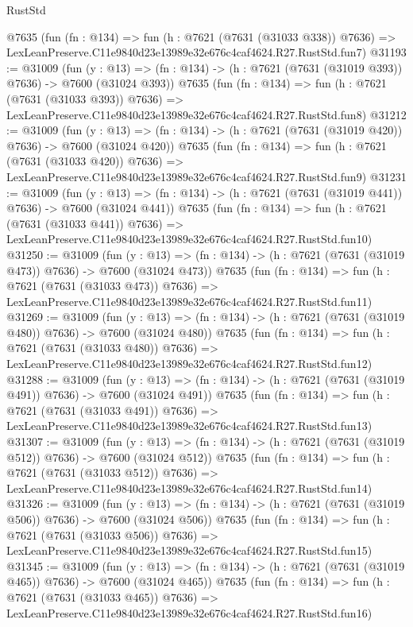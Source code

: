 \begin{lexlean}{RustStd}
\begin{coremodule}
    @7635
    (fun (fn : @134) =>
    fun (h : @7621 (@7631 (@31033 @338)) @7636) =>
    LexLeanPreserve.C11e9840d23e13989e32e676c4caf4624.R27.RustStd.fun7)
@31193 := @31009
    (fun (y : @13) => (fn : @134) -> (h : @7621 (@7631 (@31019 @393)) @7636) -> @7600 (@31024 @393))
    @7635
    (fun (fn : @134) =>
    fun (h : @7621 (@7631 (@31033 @393)) @7636) =>
    LexLeanPreserve.C11e9840d23e13989e32e676c4caf4624.R27.RustStd.fun8)
@31212 := @31009
    (fun (y : @13) => (fn : @134) -> (h : @7621 (@7631 (@31019 @420)) @7636) -> @7600 (@31024 @420))
    @7635
    (fun (fn : @134) =>
    fun (h : @7621 (@7631 (@31033 @420)) @7636) =>
    LexLeanPreserve.C11e9840d23e13989e32e676c4caf4624.R27.RustStd.fun9)
@31231 := @31009
    (fun (y : @13) => (fn : @134) -> (h : @7621 (@7631 (@31019 @441)) @7636) -> @7600 (@31024 @441))
    @7635
    (fun (fn : @134) =>
    fun (h : @7621 (@7631 (@31033 @441)) @7636) =>
    LexLeanPreserve.C11e9840d23e13989e32e676c4caf4624.R27.RustStd.fun10)
@31250 := @31009
    (fun (y : @13) => (fn : @134) -> (h : @7621 (@7631 (@31019 @473)) @7636) -> @7600 (@31024 @473))
    @7635
    (fun (fn : @134) =>
    fun (h : @7621 (@7631 (@31033 @473)) @7636) =>
    LexLeanPreserve.C11e9840d23e13989e32e676c4caf4624.R27.RustStd.fun11)
@31269 := @31009
    (fun (y : @13) => (fn : @134) -> (h : @7621 (@7631 (@31019 @480)) @7636) -> @7600 (@31024 @480))
    @7635
    (fun (fn : @134) =>
    fun (h : @7621 (@7631 (@31033 @480)) @7636) =>
    LexLeanPreserve.C11e9840d23e13989e32e676c4caf4624.R27.RustStd.fun12)
@31288 := @31009
    (fun (y : @13) => (fn : @134) -> (h : @7621 (@7631 (@31019 @491)) @7636) -> @7600 (@31024 @491))
    @7635
    (fun (fn : @134) =>
    fun (h : @7621 (@7631 (@31033 @491)) @7636) =>
    LexLeanPreserve.C11e9840d23e13989e32e676c4caf4624.R27.RustStd.fun13)
@31307 := @31009
    (fun (y : @13) => (fn : @134) -> (h : @7621 (@7631 (@31019 @512)) @7636) -> @7600 (@31024 @512))
    @7635
    (fun (fn : @134) =>
    fun (h : @7621 (@7631 (@31033 @512)) @7636) =>
    LexLeanPreserve.C11e9840d23e13989e32e676c4caf4624.R27.RustStd.fun14)
@31326 := @31009
    (fun (y : @13) => (fn : @134) -> (h : @7621 (@7631 (@31019 @506)) @7636) -> @7600 (@31024 @506))
    @7635
    (fun (fn : @134) =>
    fun (h : @7621 (@7631 (@31033 @506)) @7636) =>
    LexLeanPreserve.C11e9840d23e13989e32e676c4caf4624.R27.RustStd.fun15)
@31345 := @31009
    (fun (y : @13) => (fn : @134) -> (h : @7621 (@7631 (@31019 @465)) @7636) -> @7600 (@31024 @465))
    @7635
    (fun (fn : @134) =>
    fun (h : @7621 (@7631 (@31033 @465)) @7636) =>
    LexLeanPreserve.C11e9840d23e13989e32e676c4caf4624.R27.RustStd.fun16)

\end{coremodule}
\end{lexlean}
